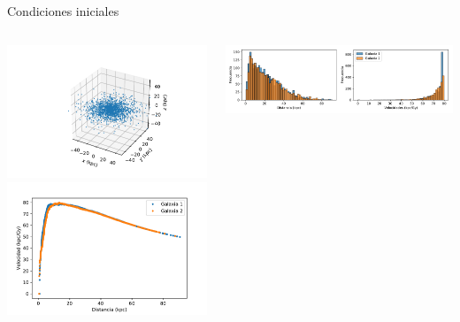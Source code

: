 \documentclass[handout]{beamer}
\begin{document}
\begin{frame}{Condiciones iniciales}
	\begin{columns}
		\begin{column}{0.5\textwidth}
			\includegraphics[height=0.35\textheight]{sources/images/galaxy_shape.pdf}\\\pause
			\includegraphics[height=0.35\textheight]{sources/images/rotation_curve.pdf}\pause
		\end{column}
		\begin{column}{0.65\textwidth}
			\includegraphics[width=\linewidth]{sources/images/galaxy_distribution.pdf}\\\pause

\end{column}
\end{columns}
\end{frame}
\end{document}
